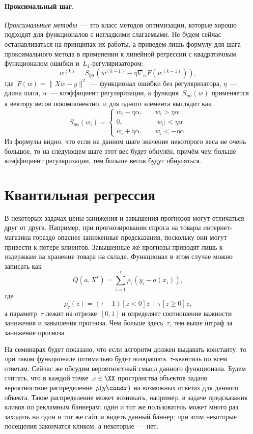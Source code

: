 \documentclass[12pt,fleqn]{article}
\begin{document}
\paragraph{Проксимальный шаг.}
\emph{Проксимальные методы}~--- это класс методов оптимизации, которые
хорошо подходят для функционалов с негладкими слагаемыми.
Не будем сейчас останавливаться на принципах их работы, а приведём лишь
формулу для шага проксимального метода в применении к линейной регрессии
с квадратичным функционалом ошибки и~$L_1$-регуляризатором:
\[
    w^{(k)}
    =
    S_{\eta \alpha} \left(
        w^{(k - 1)}
        -
        \eta
        \nabla_w F(w^{(k - 1)})
    \right),
\]
где~$F(w) = \|Xw - y\|^2$~--- функционал ошибки без регуляризатора,
$\eta$~--- длина шага,
$\alpha$~--- коэффициент регуляризации,
а функция~$S_{\eta \alpha}(w)$ применяется к вектору весов покомпонентно,
и для одного элемента выглядит как
\[
    S_{\eta \alpha} (w_i)
    =
    \begin{cases}
        w_i - \eta \alpha, \quad &w_i > \eta \alpha\\
        0, \qquad &|w_i| < \eta \alpha\\
        w_i + \eta \alpha, \quad &w_i < -\eta \alpha
    \end{cases}
\]
Из формулы видно, что если на данном шаге значение некоторого веса не очень большое,
то на следующем шаге этот вес будет обнулён, причём чем больше коэффициент регуляризации,
тем больше весов будут обнуляться.

\section{Квантильная регрессия}
В некоторых задачах цены занижения и завышения прогнозов могут отличаться друг от друга.
Например, при прогнозировании спроса на товары интернет-магазина гораздо опаснее заниженные
предсказания, поскольку они могут привести к потере клиентов.
Завышенные же прогнозы приводят лишь к издержкам на хранение товара на складе.
Функционал в этом случае можно записать как
\[
    Q(a, X^\ell)
    =
    \sum_{i = 1}^{\ell}
        \rho_\tau(y_i - a(x_i)),
\]
где
\[
    \rho_\tau(z)
    =
    (\tau - 1) [z < 0] z
    +
    \tau [z \geq 0] z,
\]
а параметр~$\tau$ лежит на отрезке~$[0, 1]$ и определяет
соотношение важности занижения и завышения прогноза.
Чем больше здесь~$\tau$, тем выше штраф за занижение прогноза.

На семинарах будет показано, что если алгоритм должен выдавать константу,
то при таком функционале оптимально будет возвращать~$\tau$-квантиль по всем ответам.
Сейчас же обсудим вероятностный смысл данного функционала.
Будем считать, что в каждой точке~$x \in \XX$ пространства объектов
задано вероятностное распределение~$p(y \cond x)$ на возможных ответах для данного объекта.
Такое распределение может возникать, например, в задаче предсказания кликов по рекламным баннерам:
один и тот же пользователь может много раз заходить на один и тот же сайт и видеть данный баннер;
при этом некоторые посещения закончатся кликом, а некоторые~--- нет.
\end{document}
